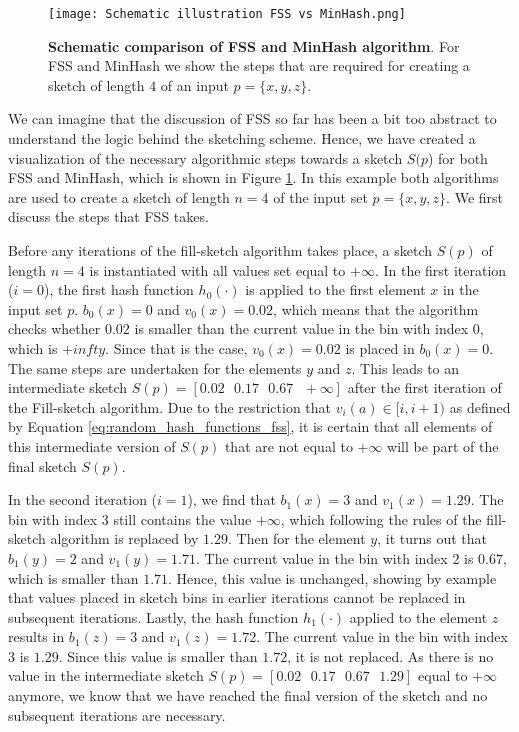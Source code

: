 \begin{figure}[!htb]
    \centering
    \texttt{[image: Schematic illustration FSS vs MinHash.png]}
    \caption[Schematic illustration of FSS and MinHash algorithm]{\textbf{Schematic comparison of FSS and MinHash algorithm}. For FSS and MinHash we show the steps that are required for creating a sketch of length $4$ of an input $p = \{x, y, z\}$. }
    \label{fig:schematic_fss_vs_minhash}
\end{figure}

We can imagine that the discussion of FSS so far has been a bit too abstract to understand the logic behind the sketching scheme. Hence, we have created a visualization of the necessary algorithmic steps towards a sketch $S(p$) for both FSS and MinHash, which is shown in Figure \ref{fig:schematic_fss_vs_minhash}. In this example both algorithms are used to create a sketch of length $n=4$ of the input set $p=\{x, y, z\}$. We first discuss the steps that FSS takes. 

Before any iterations of the fill-sketch algorithm takes place, a sketch $S(p)$ of length $n=4$ is instantiated with all values set equal to $+\infty$. In the first iteration ($i=0$), the first hash function $h_0(\cdot)$ is applied to the first element $x$ in the input set $p$. $b_0(x) = 0 $ and $v_0(x) = 0.02$, which means that the algorithm checks whether $0.02$ is smaller than the current value in the bin with index $0$, which is $+infty$. Since that is the case, $v_0(x) = 0.02$ is placed in  $b_0(x) = 0 $. The same steps are undertaken for the elements $y$ and $z$. This leads to an intermediate sketch $S(p) = [0.02\text{  }0.17\text{  }0.67\text{  }+\infty]$ after the first iteration of the Fill-sketch algorithm. Due to the restriction that $v_i(a) \in [i, i + 1)$ as defined by Equation \ref{eq:random_hash_functions_fss},  it is certain that all elements of this intermediate version of $S(p)$ that are not equal to $+\infty$ will be part of the final sketch $S(p)$. 

In the second iteration ($i=1$), we find that $b_1(x) = 3 $ and $v_1(x)=1.29$. The bin with index $3$ still contains the value $+\infty$, which following the rules of the fill-sketch algorithm is replaced by $1.29$. Then for the element $y$, it turns out that $b_1(y)=2$ and $v_1(y) = 1.71$. The current value in the bin with index $2$ is $0.67$, which is smaller than $1.71$. Hence, this value is unchanged, showing by example that values placed in sketch bins in earlier iterations cannot be replaced in subsequent iterations. Lastly, the hash function $h_1(\cdot)$ applied to the element $z$ results in $b_1(z) = 3$ and $v_1(z) = 1.72$. The current value in the bin with index $3$ is $1.29$. Since this value is smaller than $1.72$, it is not replaced. As there is no value in the intermediate sketch $S(p) = [0.02\text{  }0.17\text{  }0.67\text{  }1.29]$ equal to $+\infty$ anymore, we know that we have reached the final version of the sketch and no subsequent iterations are necessary.

